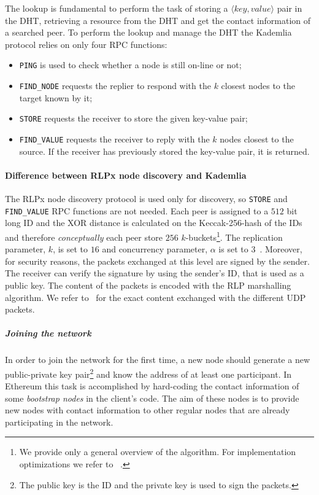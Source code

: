 The lookup is fundamental to perform the task of storing a $\langle key,
value\rangle$ pair in the DHT, retrieving a resource from the DHT and get
the contact information of a searched peer.
To perform the lookup and manage the DHT the Kademlia protocol relies on only 
four RPC functions:
\begin{itemize}
	\item \verb|PING| is used to check whether a node is still on-line
	or not;
	\item \verb|FIND_NODE| requests the replier to respond with the $k$ closest
	nodes to the target known by it;
	\item \verb|STORE| requests the receiver to store the given
	key-value pair;
	\item \verb|FIND_VALUE| requests the receiver to reply with the $k$
	nodes closest to the source. If the receiver has previously stored the
	key-value pair, it is returned.
\end{itemize}


\paragraph{Difference between RLPx node discovery and Kademlia}
\label{sec:rlpx-discovery}
The RLPx node discovery protocol is used only for discovery, so
\verb|STORE| and \verb|FIND_VALUE| RPC functions are not 
needed.
Each peer is assigned to a $512$ bit long ID and the XOR distance is calculated
on the Keccak-256-hash of the IDs and therefore
\emph{conceptually} each peer store $256$ $k$-buckets\footnote{
	We provide only a general overview of the algorithm. For implementation
	optimizations we refer to ~\cite{bib:kademlia}.}.
The replication parameter, $k$, is set to $16$ and concurrency parameter, $\alpha$ is set to $3$~\cite{bib:rlpx-discovery-protocol}.
Moreover, for security reasons, the packets exchanged at this level are signed
by the sender. The receiver can verify the signature by using the sender's ID, 
that is used as a public key.
The content of the packets is encoded with the RLP marshalling algorithm.
We refer to~\cite{bib:rlpx-discovery-protocol} for the exact content exchanged 
with the different UDP packets.





\subparagraph{Joining the network}
In order to join the network for the first time, a new node should generate a
new public-private key pair\footnote{The public key is the ID and the private
key is used to sign the packets.} and know the address of at least one
participant. In Ethereum this task is accomplished by hard-coding the contact
information of some \textit{bootstrap nodes} in the client's code. The aim of
these nodes is to provide new nodes with contact information to other regular
nodes that are already participating in the network.

